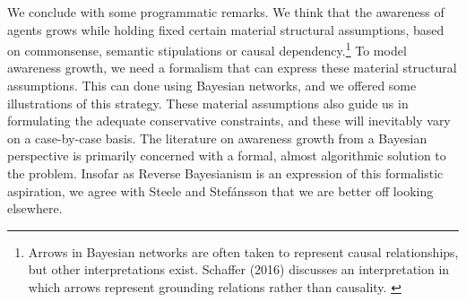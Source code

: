 \documentclass[
  11pt,
  dvipsnames,enabledeprecatedfontcommands]{scrartcl}
\begin{document}
We conclude with some programmatic remarks. We think that the awareness
of agents grows while holding fixed certain material structural
assumptions, based on commonsense, semantic stipulations or causal
dependency.\footnote{Arrows in Bayesian networks are often taken to
  represent causal relationships, but other interpretations exist.
  Schaffer (2016) discusses an interpretation in which arrows represent
  grounding relations rather than causality. \label{footnote:causation}}
To model awareness growth, we need a formalism that can express these
material structural assumptions. This can done using Bayesian networks,
and we offered some illustrations of this strategy. These material
assumptions also guide us in formulating the adequate conservative
constraints, and these will inevitably vary on a case-by-case basis. The
literature on awareness growth from a Bayesian perspective is primarily
concerned with a formal, almost algorithmic solution to the problem.
Insofar as Reverse Bayesianism is an expression of this formalistic
aspiration, we agree with Steele and Stefánsson that we are better off
looking elsewhere.
\end{document}
